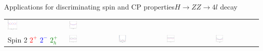 \documentclass[usenames,dvipsnames,svgnames,table]{beamer}
\begin{document}
\begin{frame}{Applications for discriminating spin and CP properties}{$H\to ZZ\to 4l$ decay}
\begin{tabular}{m{}m{}m{}m{}m{}}
\noindent\includegraphics[width=0.18\textwidth]{onthespinandparity/phistar1_125GeV_spin1} &
\noindent\includegraphics[width=0.18\textwidth]{onthespinandparity/costheta1_125GeV_spin1} \\
\footnotesize\centering Spin 2 \tiny \textcolor{red}{$2^+$} \textcolor{blue}{$2^-$} \textcolor{Green}{$2_h^+$} &
\noindent\includegraphics[width=0.18\textwidth]{onthespinandparity/phi_125GeV_spin2} &
\noindent\includegraphics[width=0.18\textwidth]{onthespinandparity/costhetastar_125GeV_spin2}&
\noindent\includegraphics[width=0.18\textwidth]{onthespinandparity/phistar1_125GeV_spin2} &
\noindent\includegraphics[width=0.18\textwidth]{onthespinandparity/costheta1_125GeV_spin2}
\end{tabular}
\end{frame}
\end{document}
